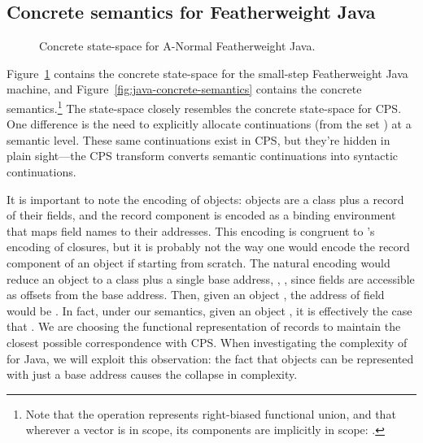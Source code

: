 \subsection{Concrete semantics for Featherweight Java}

\begin{figure}
\begin{small}
\begin{small}\end{small}\end{small}\caption{Concrete state-space for A-Normal Featherweight Java.}
\label{fig:java-concrete-state-space}
\end{figure}


Figure~\ref{fig:java-concrete-state-space} contains the concrete
state-space for the small-step Featherweight Java machine, and
Figure~\ref{fig:java-concrete-semantics} contains the concrete
semantics.\footnote{
Note that the  operation represents right-biased functional
  union, and that wherever a vector  is in scope, its
  components are implicitly in scope: .  }
The state-space closely resembles the concrete state-space for CPS.
One difference is the need to explicitly allocate continuations (from
the set ) at a semantic level.
These same continuations exist in CPS, but they're hidden in plain
sight---the CPS transform converts semantic
continuations into syntactic continuations.





It is important to note the encoding of objects:
objects are a class plus a record of their fields, and
the record component is encoded as a binding environment that maps
field names to their addresses.
This encoding is congruent to \kCFA's encoding of closures, but it is
probably not the way one would encode the record component of an
object if starting from scratch.
The natural encoding would reduce an object to a class plus a single
base address, \ie, , since
fields are accessible as offsets from the base address.
Then, given an object , the address of field 
would be .
In fact, under our semantics, given an object , it
is effectively the case that .
We are choosing the functional representation of records to
maintain the closest possible correspondence with CPS. 
When investigating the complexity of \kCFA{} for Java, we will exploit
this observation: the fact that objects can be represented with just
a base address causes the collapse in complexity.


